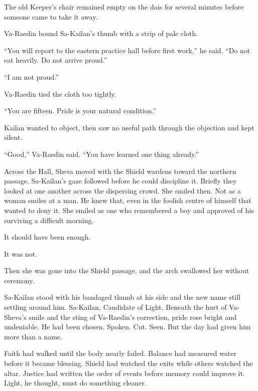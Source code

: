The old Keeper’s chair remained empty on the dais for several minutes before someone came to take it away.\par

Va-Raedin bound Sa-Kailan’s thumb with a strip of pale cloth.\par

“You will report to the eastern practice hall before first work,” he said. “Do not eat heavily. Do not arrive proud.”\par

“I am not proud.”\par

Va-Raedin tied the cloth too tightly.\par

“You are fifteen. Pride is your natural condition.”\par

Kailan wanted to object, then saw no useful path through the objection and kept silent.\par

“Good,” Va-Raedin said. “You have learned one thing already.”\par

Across the Hall, Sheva moved with the Shield wardens toward the northern passage. Sa-Kailan’s gaze followed before he could discipline it. Briefly they looked at one another across the dispersing crowd. She smiled then. Not as a woman smiles at a man. He knew that, even in the foolish centre of himself that wanted to deny it. She smiled as one who remembered a boy and approved of his surviving a difficult morning.\par

It should have been enough.\par

It was not.\par

Then she was gone into the Shield passage, and the arch swallowed her without ceremony.\par

Sa-Kailan stood with his bandaged thumb at his side and the new name still settling around him. Sa-Kailan, Candidate of Light. Beneath the hurt of Va-Sheva’s smile and the sting of Va-Raedin’s correction, pride rose bright and undeniable. He had been chosen. Spoken. Cut. Seen. But the day had given him more than a name.\par

Faith had walked until the body nearly failed. Balance had measured water before it became blessing. Shield had watched the exits while others watched the altar. Justice had written the order of events before memory could improve it. Light, he thought, must do something cleaner.\par

